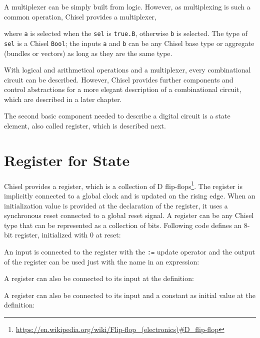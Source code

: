 \documentclass[%
    10pt,
    headinclude, footexclude,
    openright, %
    notitlepage,
    cleardoubleempty,
    headsepline,
    pointlessnumbers,
    bibtotoc, idxtotoc,
    ]{scrbook}
\newcommand{\code}[1]{{\small{\texttt{#1}}}}
\newcommand{\myref}[2]{\href{#1}{#2}}
\renewcommand{\myref}[2]{{#2}{\footnote{\url{#1}}}}
\begin{document}
A multiplexer can be simply built from logic.
However, as multiplexing  is such a common operation, Chisel provides a multiplexer,


\noindent where \code{a} is selected when the \code{sel} is \code{true.B}, otherwise \code{b}
is selected. The type of \code{sel} is a Chisel \code{Bool}; the inputs \code{a} and \code{b}
can be any Chisel base type or aggregate (bundles or vectors) as long as they are the same
type.

With logical and arithmetical operations and a multiplexer, every combinational
circuit can be described. However, Chisel provides further components and control abstractions
for a more elegant description of a combinational circuit, which are described in
a later chapter.

The second basic component needed to describe a digital circuit is a state element,
also called register, which is described next.

\section{Register for State}

Chisel provides a register, which is a collection of
\myref{https://en.wikipedia.org/wiki/Flip-flop\_(electronics)\#D\_flip-flop}{D flip-flops}.
The register is implicitly connected to a global clock and is updated on the rising edge.
When an initialization value is provided at the declaration of the register,
it uses a synchronous reset connected to a global reset signal.
A register can be any Chisel type that can be represented as a collection of bits.
Following code defines an 8-bit register, initialized with 0 at reset:


\noindent An input is connected to the register with the \code{:=} update operator and
the output of the register can be used just with the name in an expression:


\noindent A register can also be connected to its input at the definition:


\noindent A register can also be connected to its input and a constant as
initial value at the definition:

\end{document}
